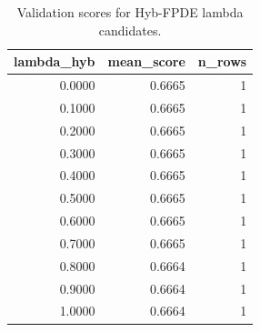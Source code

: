\begin{table}[t]
\caption{Validation scores for Hyb-FPDE lambda candidates.}
\label{tab:lambda_distribution_computed}
\centering
\begin{tabular}{rrr}
\toprule
lambda\_hyb & mean\_score & n\_rows \\
\midrule
0.0000 & 0.6665 & 1 \\
0.1000 & 0.6665 & 1 \\
0.2000 & 0.6665 & 1 \\
0.3000 & 0.6665 & 1 \\
0.4000 & 0.6665 & 1 \\
0.5000 & 0.6665 & 1 \\
0.6000 & 0.6665 & 1 \\
0.7000 & 0.6665 & 1 \\
0.8000 & 0.6664 & 1 \\
0.9000 & 0.6664 & 1 \\
1.0000 & 0.6664 & 1 \\
\bottomrule
\end{tabular}

\end{table}
